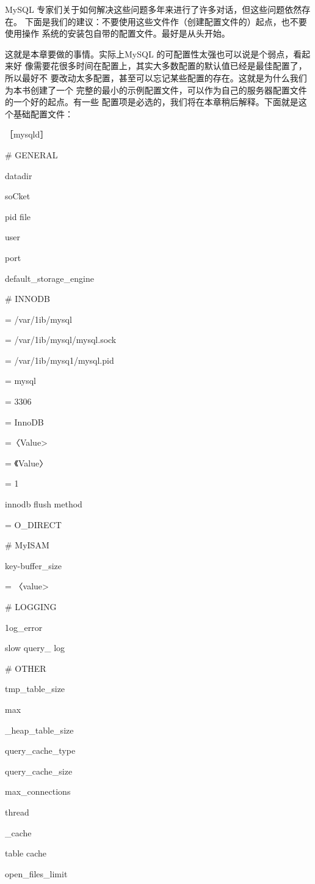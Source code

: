 MySQL 专家们关于如何解决这些问题多年来进行了许多对话，但这些问题依然存在。
下面是我们的建议：不要使用这些文件作（创建配置文件的）起点，也不要使用操作
系统的安装包自带的配置文件。最好是从头开始。

这就是本章要做的事情。实际上MySQL 的可配置性太强也可以说是个弱点，看起来好
像需要花很多时间在配置上，其实大多数配置的默认值已经是最佳配置了，所以最好不
要改动太多配置，甚至可以忘记某些配置的存在。这就是为什么我们为本书创建了一个
完整的最小的示例配置文件，可以作为自己的服务器配置文件的一个好的起点。有一些
配置项是必选的，我们将在本章稍后解释。下面就是这个基础配置文件：

［mysqld］

# GENERAL

datadir

soCket

pid file

user

port

default\_storage\_engine

# INNODB

= /var/1ib/mysql

= /var/1ib/mysql/mysql.sock

= /var/1ib/mysq1/mysql.pid

= mysql

= 3306

= InnoDB

=〈Value>

= 《Value〉

= 1

innodb flush method

= O\_DIRECT

# MyISAM

key-buffer\_size

= 〈value>

# LOGGING

1og\_error

slow query\_ log

# OTHER

tmp\_table\_size

max

\_heap\_table\_size

query\_cache\_type

query\_cache\_size

max\_connections

thread

\_cache

table cache

open\_files\_limit

